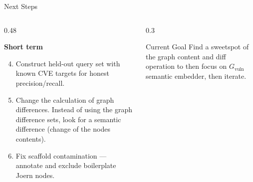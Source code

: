\documentclass[aspectratio=169,10pt]{beamer}
\begin{document}
\begin{frame}{Next Steps}
\begin{columns}[T]
\begin{column}{0.48\textwidth}
   

  \vspace{0.8em}
  \textbf{Short term}
  \begin{enumerate}\setcounter{enumi}{3}
    \item Construct held-out query set with known
      CVE targets for honest precision/recall.
    
    \item Change the calculation of graph differences. 
      Instead of using the graph difference sets, look for a semantic difference (change of the nodes contents).
     \item Fix scaffold contamination — annotate
      and exclude boilerplate Joern nodes.
  \end{enumerate}
\end{column}
\begin{column}{0.3\textwidth}

  \vspace{0.5em}
  \begin{block}{Current Goal}
    Find a sweetspot of the graph content and diff operation to then focus on $G_{\text{vuln}}$
    semantic embedder, then iterate.
  \end{block}
\end{column}
\end{columns}
\end{frame}
\end{document}

